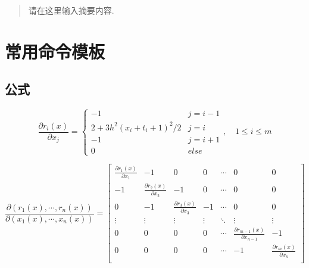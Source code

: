 \documentclass{zjgsureport}
\date{\zhtoday}
\begin{document}
\makecover  %

\begin{abstract}
请在这里输入摘要内容.
\end{abstract}
\newpage


\thispagestyle{empty}
\tableofcontents



\newpage
\setcounter{page}{1}

\section{常用命令模板}

\subsection{公式} 

\begin{equation*}
    \frac{\partial r_i(x)}{\partial x_j}=
    \begin{cases} -1& j=i-1\\ 2+3h^2(x_i+t_i+1)^2/2& j=i\\ -1& j=i+1\\0& else \end{cases}
    ,\quad 1\leq i \leq m
\end{equation*}

\begin{equation*}
\frac{\partial(r_1(x),\cdots,r_n(x))}{\partial (x_1(x),\cdots,x_n(x))}=
\begin{bmatrix}
\frac{\partial r_1(x)}{\partial x_1} & -1 & 0 & 0& \cdots & 0& 0 \\
-1 & \frac{\partial r_2(x)}{\partial x_2} & -1& 0 & \cdots & 0 & 0\\
0& -1 & \frac{\partial r_3(x)}{\partial x_3} & -1  & \cdots& 0& 0 \\
\vdots & \vdots & \vdots & \vdots & \ddots& \vdots& \vdots \\
0 & 0 &0 & 0 & \cdots & \frac{\partial r_{m-1}(x)}{\partial x_{n-1}}& -1\\
0 & 0 &0 & 0 & \cdots & -1 &\frac{\partial r_m(x)}{\partial x_n}\\
\end{bmatrix}
\end{equation*}
\end{document}
